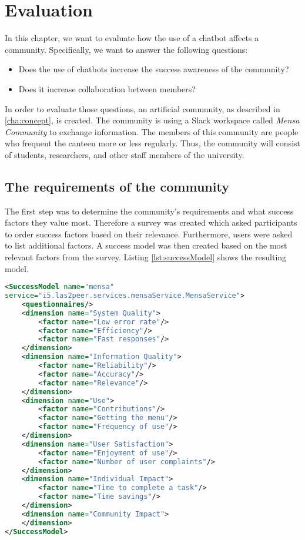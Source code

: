\chapter{Evaluation}\label{cha:eval}
In this chapter, we want to evaluate how the use of a chatbot affects a community.
Specifically, we want to answer the following questions:
\begin{itemize}
    \item Does the use of chatbots increase the success awareness of the community?
    \item Does it increase collaboration between members?
\end{itemize}

In order to evaluate those questions, an artificial community, as described in \ref{cha:concept}, is created.  
The community is using a Slack workspace called \emph{Mensa Community} to exchange information.
The members of this community are people who frequent the canteen more or less regularly.
Thus, the community will consist of students, researchers, and other staff members of the university.

\section{The requirements of the community}
The first step was to determine the community's requirements and what success factors they value most.
Therefore a survey was created which asked participants to order success factors based on their relevance. 
Furthermore, users were asked to list additional factors.
A success model was then created based on the most relevant factors from the survey. Listing \ref{lst:successModel} shows the resulting model.

\begin{lstlisting}[language=XML,caption=Success Model based on requirements, label=lst:successModel]
<SuccessModel name="mensa" 
service="i5.las2peer.services.mensaService.MensaService">
    <questionnaires/>
    <dimension name="System Quality">
        <factor name="Low error rate"/>
        <factor name="Efficiency"/>
        <factor name="Fast responses"/>
    </dimension>
    <dimension name="Information Quality">
        <factor name="Reliability"/>
        <factor name="Accuracy"/>
        <factor name="Relevance"/>
    </dimension>
    <dimension name="Use">
        <factor name="Contributions"/>
        <factor name="Getting the menu"/>
        <factor name="Frequency of use"/>
    </dimension>
    <dimension name="User Satisfaction">
        <factor name="Enjoyment of use"/>
        <factor name="Number of user complaints"/>
    </dimension>
    <dimension name="Individual Impact">
        <factor name="Time to complete a task"/>
        <factor name="Time savings"/>
    </dimension>
    <dimension name="Community Impact">
    </dimension>
</SuccessModel>
\end{lstlisting}

